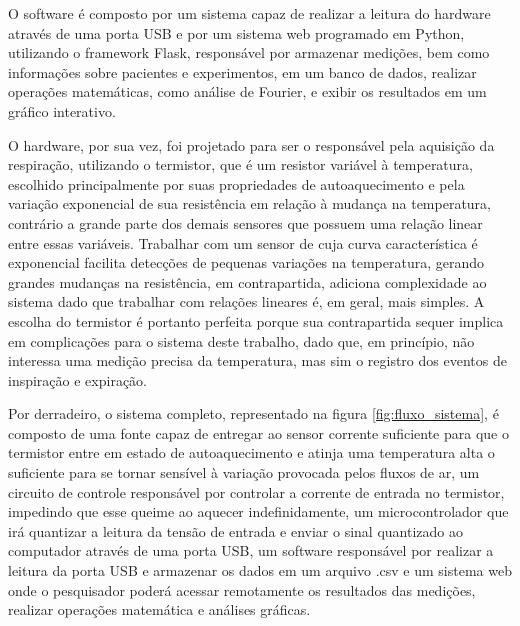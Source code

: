 		O software é composto por um sistema capaz de realizar a leitura do hardware através de uma porta USB e por um sistema web programado em Python, utilizando o framework Flask, responsável por armazenar medições, bem como informações sobre pacientes e experimentos, em um banco de dados, realizar operações matemáticas, como análise de Fourier, e exibir os resultados em um gráfico interativo. 
		
		O hardware, por sua vez, foi projetado para ser o responsável pela aquisição da respiração, utilizando o termistor, que é um resistor variável à temperatura, escolhido principalmente por suas propriedades de autoaquecimento e pela variação exponencial de sua resistência em relação à mudança na temperatura, contrário a grande parte dos demais sensores que possuem uma relação linear entre essas variáveis. Trabalhar com um sensor de cuja curva característica é exponencial facilita detecções de pequenas variações na temperatura, gerando grandes mudanças na resistência, em contrapartida, adiciona complexidade ao sistema dado que trabalhar com relações lineares é, em geral, mais simples. A escolha do termistor é portanto perfeita porque sua contrapartida sequer implica em complicações para o sistema deste trabalho, dado que, em princípio, não interessa uma medição precisa da temperatura, mas sim o registro dos eventos de inspiração e expiração.
		
		Por derradeiro, o sistema completo, representado na figura \ref{fig:fluxo_sistema}, é composto de uma fonte capaz de entregar ao sensor corrente suficiente para que o termistor entre em estado de autoaquecimento e atinja uma temperatura alta o suficiente para se tornar sensível à variação provocada pelos fluxos de ar, um circuito de controle responsável por controlar a corrente de entrada no termistor, impedindo que esse queime ao aquecer indefinidamente, um microcontrolador que irá quantizar a leitura da tensão de entrada e enviar o sinal quantizado ao computador através de uma porta USB, um software responsável por realizar a leitura da porta USB e armazenar os dados em um arquivo .csv e um sistema web onde o pesquisador poderá acessar remotamente os resultados das medições, realizar operações matemática e análises gráficas.
				
